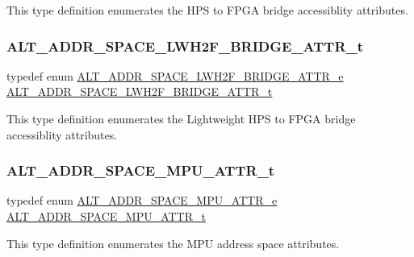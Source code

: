 This type definition enumerates the H\+PS to F\+P\+GA bridge accessiblity attributes. \mbox{\label{group__ADDR__SPACE__MGR__REMAP_gac800113e41ec261e9babdebcd057d754}} 
\subsubsection{\texorpdfstring{ALT\_ADDR\_SPACE\_LWH2F\_BRIDGE\_ATTR\_t}{ALT\_ADDR\_SPACE\_LWH2F\_BRIDGE\_ATTR\_t}}
{\footnotesize\ttfamily typedef enum \mbox{\hyperlink{group__ADDR__SPACE__MGR__REMAP_gada9fe5e35537a5407d3e5a5216e3f6b5}{A\+L\+T\+\_\+\+A\+D\+D\+R\+\_\+\+S\+P\+A\+C\+E\+\_\+\+L\+W\+H2\+F\+\_\+\+B\+R\+I\+D\+G\+E\+\_\+\+A\+T\+T\+R\+\_\+e}}  \mbox{\hyperlink{group__ADDR__SPACE__MGR__REMAP_gac800113e41ec261e9babdebcd057d754}{A\+L\+T\+\_\+\+A\+D\+D\+R\+\_\+\+S\+P\+A\+C\+E\+\_\+\+L\+W\+H2\+F\+\_\+\+B\+R\+I\+D\+G\+E\+\_\+\+A\+T\+T\+R\+\_\+t}}}

This type definition enumerates the Lightweight H\+PS to F\+P\+GA bridge accessiblity attributes. \mbox{\label{group__ADDR__SPACE__MGR__REMAP_ga7b565bdc174300bbaf78d71ec496ac05}} 
\subsubsection{\texorpdfstring{ALT\_ADDR\_SPACE\_MPU\_ATTR\_t}{ALT\_ADDR\_SPACE\_MPU\_ATTR\_t}}
{\footnotesize\ttfamily typedef enum \mbox{\hyperlink{group__ADDR__SPACE__MGR__REMAP_gae16f0dfb718350b5140753a935059440}{A\+L\+T\+\_\+\+A\+D\+D\+R\+\_\+\+S\+P\+A\+C\+E\+\_\+\+M\+P\+U\+\_\+\+A\+T\+T\+R\+\_\+e}}  \mbox{\hyperlink{group__ADDR__SPACE__MGR__REMAP_ga7b565bdc174300bbaf78d71ec496ac05}{A\+L\+T\+\_\+\+A\+D\+D\+R\+\_\+\+S\+P\+A\+C\+E\+\_\+\+M\+P\+U\+\_\+\+A\+T\+T\+R\+\_\+t}}}

This type definition enumerates the M\+PU address space attributes.

